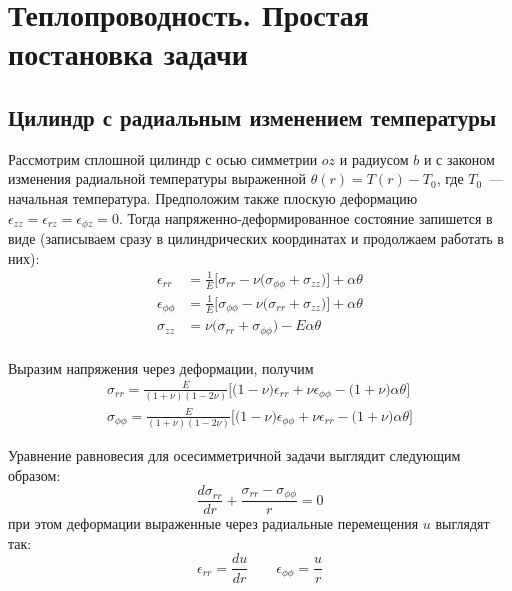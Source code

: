 \chapter{Теплопроводность. Простая постановка задачи}\label{ch:ch10}

\section{Цилиндр с радиальным изменением температуры}\label{sec:ch10/sec1}

Рассмотрим сплошной цилиндр с осью симметрии \(oz\) и радиусом \(b\) и с законом изменения радиальной температуры выраженной \(\theta(r)=T(r)-T_0\), где \(T_0\)~--- начальная температура. Предположим также плоскую деформацию \(\epsilon_{zz}=\epsilon_{rz}=\epsilon_{\phi z}=0\). Тогда напряженно-деформированное состояние запишется в виде (записываем сразу в цилиндрических координатах и продолжаем работать в них):
\begin{equation}
	\label{eq:ch10:equation1}
\begin{split}
	\epsilon_{rr} &= \frac{1}{E} \big [\sigma_{rr} - \nu \big(\sigma_{\phi\phi} + \sigma_{zz}\big) \big] + \alpha \theta \\
	\epsilon_{\phi\phi} &= \frac{1}{E} \big [\sigma_{\phi\phi} - \nu \big(\sigma_{rr} + \sigma_{zz}\big) \big] + \alpha \theta \\
	\sigma_{zz} &= \nu \big(\sigma_{rr} + \sigma_{\phi\phi}\big) - E\alpha\theta \\
\end{split}
\end{equation}	

Выразим напряжения через деформации, получим
\begin{equation}
	\label{eq:ch10:equation2}
	\begin{split}
		\sigma_{rr} = \frac{E}{(1+\nu)(1-2\nu)} \big[\big(1-\nu \big)\epsilon_{rr} + \nu\epsilon_{\phi\phi} - \big(1+\nu\big )\alpha\theta\big] \\
		\sigma_{\phi\phi} = \frac{E}{(1+\nu)(1-2\nu)} \big[\big(1-\nu \big)\epsilon_{\phi\phi} + \nu\epsilon_{rr} - \big(1+\nu\big )\alpha\theta\big] 
	\end{split}
\end{equation}

Уравнение равновесия для осесимметричной задачи выглядит следующим образом:
\begin{equation}
	\label{eq:ch10:equation3}
		\frac {d\sigma_{rr} }{dr} + \frac {\sigma_{rr}-\sigma_{\phi\phi}}{r}=0
\end{equation}
при этом деформации выраженные через радиальные перемещения \(u\) выглядят так:
\begin{equation}
	\label{eq:ch10:equation4}
	\epsilon_{rr} = \frac{du}{dr} \qquad \epsilon_{\phi\phi} = \frac{u}{r}
\end{equation}

